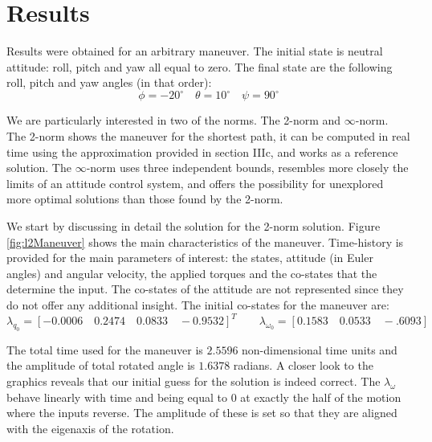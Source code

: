 \section{Results}

Results were obtained for an arbitrary maneuver. The initial state is neutral attitude: roll, pitch and yaw all equal to zero. The final state are the following roll, pitch and yaw angles (in that order):
\begin{equation}
\phi=-20^\circ \quad \theta=10^\circ \quad \psi=90^\circ
\end{equation}

We are particularly interested in two of the norms. The 2-norm and $\infty$-norm. The 2-norm shows the maneuver for the shortest path, it can be computed in real time using the approximation provided in section IIIc, and works as a reference solution. The $\infty$-norm uses three independent bounds, resembles more closely the limits of an attitude control system, and offers the possibility for unexplored more optimal solutions than those found by the 2-norm.

We start by discussing in detail the solution for the 2-norm solution. Figure \ref{fig:l2Maneuver} shows the main characteristics of the maneuver. Time-history is provided for the main parameters of interest: the states, attitude (in Euler angles) and angular velocity, the applied torques and the co-states that the determine the input. The co-states of the attitude are not represented since they do not offer any additional insight. The initial co-states for the maneuver are:
\begin{equation}
\lambda_{q_0} = [-0.0006 \quad 0.2474 \quad 0.0833 \quad -0.9532]^T \qquad
\lambda_{\omega_0} = [0.1583 \quad 0.0533 \quad -.6093]
\end{equation}

The total time used for the maneuver is $2.5596$ non-dimensional time units and the amplitude of total rotated angle is $1.6378$ radians. A closer look to the graphics reveals that our initial guess for the solution is indeed correct. The $\lambda_{\omega}$ behave linearly with time and being equal to 0 at exactly the half of the motion where the inputs reverse. The amplitude of these is set so that they are aligned with the eigenaxis of the rotation.

